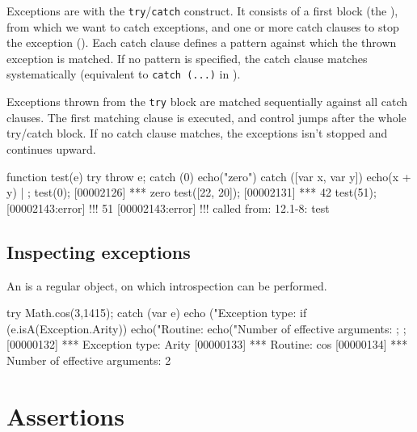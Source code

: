 Exceptions are  with the
\lstinline|try|/\lstinline|catch| construct. It consists of a first
block (the ), from which we want to catch exceptions,
and one or more catch clauses to stop the exception
(). Each catch clause defines a pattern against
which the thrown exception is matched. If no pattern is specified, the
catch clause matches systematically (equivalent to
\lstinline|catch (...)| in \Cxx).

Exceptions thrown from the \texttt{try} block are matched sequentially
against all catch clauses. The first matching clause is executed, and
control jumps after the whole try/catch block. If no catch clause
matches, the exceptions isn't stopped and continues
upward.

\begin{urbiscript}
function test(e)
{
  try
  { throw e;  }
  catch (0)
  { echo("zero") }
  catch ([var x, var y])
  { echo(x + y) }
} | {};
test(0);
[00002126] *** zero
test([22, 20]);
[00002131] *** 42
test(51);
[00002143:error] !!! 51
[00002143:error] !!!    called from: 12.1-8: test
\end{urbiscript}

\subsection{Inspecting exceptions}

An  is a regular object, on which introspection
can be performed.

\begin{urbiscript}
try
{
  Math.cos(3,1415);
}
catch (var e)
{
  echo ("Exception type: %
  if (e.isA(Exception.Arity))
  {
    echo("Routine: %
    echo("Number of effective arguments: %
  };
};
[00000132] *** Exception type: Arity
[00000133] *** Routine: cos
[00000134] *** Number of effective arguments: 2
\end{urbiscript}


\section{Assertions}
\label{sec:assertions}

